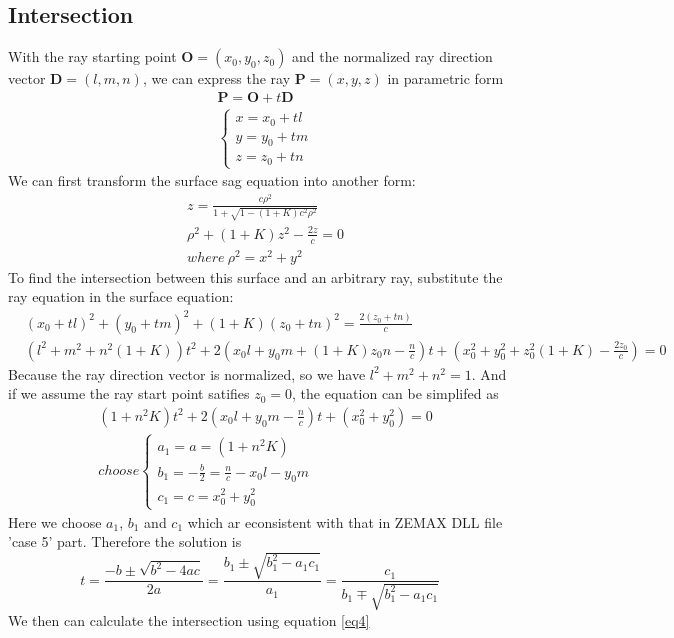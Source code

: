 \documentclass[../main.tex]{subfiles}
\begin{document}
	\subsection{Intersection}
	With the ray starting point $\textbf{O}=(x_0,y_0,z_0)$ and the normalized ray direction vector $\textbf{D}=(l,m,n)$, we can express the ray $\textbf{P}=(x,y,z)$ in parametric form
	\begin{align}
	&\textbf{P}=\textbf{O}+t\textbf{D}\\
	&\left\{
		\begin{array}{ll}
		x=x_0+tl\\
		y=y_0+tm\\
		z=z_0+tn
		\end{array}
		\right.\label{eq4}
	\end{align}
	We can first transform the surface sag equation into another form:
	\begin{align}
	&z=\frac{c\rho^2}{1+\sqrt{1-(1+K)c^2\rho^2}}\\
	&\rho^2+(1+K)z^2-\frac{2z}{c}=0\\
	&where\ \rho^2=x^2+y^2
	\end{align}
	To find the intersection between this surface and an arbitrary ray, substitute the ray equation in the surface equation:
	\begin{align}
	&(x_0+tl)^2+(y_0+tm)^2+(1+K)(z_0+tn)^2=\frac{2(z_0+tn)}{c}\\
	&(l^2+m^2+n^2(1+K))t^2+2\left(x_0l+y_0m+(1+K)z_0n-\frac{n}{c}\right)t+(x_0^2+y_0^2+z_0^2(1+K)-\frac{2z_0}{c})=0
	\end{align}
	Because the ray direction vector is normalized, so we have $l^2+m^2+n^2=1$. And if we assume the ray start point satifies $z_0=0$, the equation can be simplifed as
	\begin{align}
	&(1+n^2K)t^2+2\left(x_0l+y_0m-\frac{n}{c}\right)t+(x_0^2+y_0^2)=0\\
	&choose	\left\{
				\begin{array}{ll}
				a_1=a=(1+n^2K)\\
				b_1=-\frac{b}{2}=\frac{n}{c}-x_0l-y_0m\\
				c_1=c=x_0^2+y_0^2
				\end{array}
				\right.
	\end{align}
	Here we choose $a_1$, $b_1$ and $c_1$ which ar econsistent with that in ZEMAX DLL file 'case 5' part. Therefore the solution is 
	\begin{equation}
	t=\frac{-b\pm\sqrt{b^2-4ac}}{2a}=\frac{b_1\pm\sqrt{b_1^2-a_1c_1}}{a_1}=\frac{c_1}{b_1\mp\sqrt{b_1^2-a_1c_1}}
	\end{equation}
	We then can calculate the intersection using equation \ref{eq4}
\end{document}
